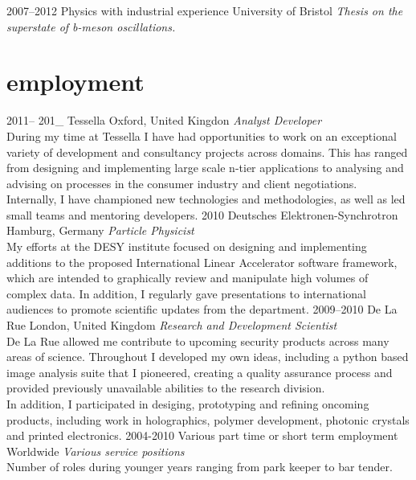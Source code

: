 \documentclass[]{friggeri-cv} %
\begin{document}
\begin{entrylist}
\entry
{2007--2012}
{Physics {\normalfont with industrial experience}}
{University of Bristol}
{\emph{Thesis on the superstate of b-meson oscillations.} }
\end{entrylist}


\section{employment}

\begin{entrylist}
\entry
{2011-- 201\_ }
{Tessella}
{Oxford, United Kingdon}
{\emph{Analyst Developer} \\
During my time at Tessella I have had opportunities to work on an exceptional variety of development and consultancy projects across domains. This has ranged from designing and implementing large scale n-tier applications to analysing and advising on processes in the consumer industry and client negotiations.\\
Internally, I have championed new technologies and methodologies, as well as led small teams and mentoring developers.} 
\entry
{2010}
{Deutsches Elektronen-Synchrotron}
{Hamburg, Germany}
{\emph{Particle Physicist} \\
My efforts at the DESY  institute focused on designing and implementing additions to
the proposed International Linear Accelerator software framework, which are intended to graphically review
and manipulate high volumes of complex data. In addition, I regularly gave presentations to international audiences to promote scientific updates from the department.} 
\entry
{2009--2010}
{De La Rue}
{London, United Kingdom}
{\emph{Research and Development Scientist} \\
De La Rue allowed me contribute to upcoming security
products across many areas of science. Throughout I developed my own ideas, including a python based image analysis suite that I pioneered, creating a quality assurance process and provided previously unavailable abilities to the research division. \\
In addition, I participated in desiging, prototyping and refining oncoming products, including  work in holographics, polymer development, photonic crystals and printed electronics.}
\entry
{2004-2010}
{Various part time or short term employment}
{Worldwide}
{\emph{Various service positions} \\
Number of roles during younger years ranging from park keeper to bar tender.}
\end{entrylist}
\end{document}
